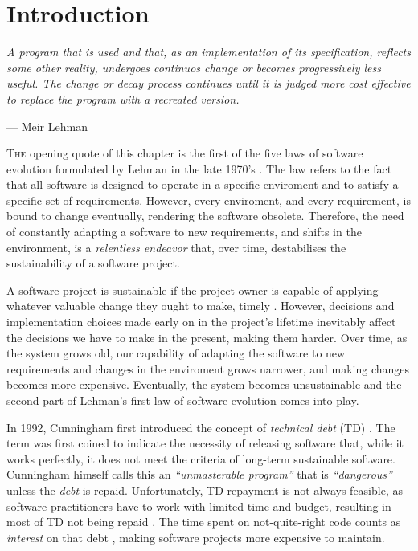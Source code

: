 \chapter{Introduction}\label{chap:introduction}

\epigraph{\emph{A program that is used and that, as an implementation of its specification, reflects some other reality, undergoes continuos change or becomes progressively less useful.
The change or decay process continues until it is judged more cost effective to replace the program with a recreated version.}}{--- Meir Lehman}

\lettrine{T}{he} opening quote of this chapter is the first of the five laws of software evolution formulated by Lehman in the late 1970's \cite{Lehman1979}.
The law refers to the fact that all software is designed to operate in a specific enviroment and to satisfy a specific set of requirements. 
However, every enviroment, and every requirement, is bound to change eventually, rendering the software obsolete. %
Therefore, the need of constantly adapting a software to new requirements, and shifts in the environment, is a \emph{relentless endeavor} that, over time, destabilises the sustainability of a software project.

A software project is sustainable if the project owner is capable of applying whatever valuable change they ought to make, timely \cite{Winters2020}.
However, decisions and implementation choices made early on in the project's lifetime inevitably affect the decisions we have to make in the present, making them harder.
Over time, as the system grows old, our capability of adapting the software to new requirements and changes in the enviroment grows narrower, and making changes becomes more expensive.
Eventually, the system becomes unsustainable and the second part of Lehman's first law of software evolution comes into play.

In 1992, Cunningham first introduced the concept of \emph{technical debt} (TD) \cite{Cunningham1992}. 
The term was first coined to indicate the necessity of releasing software that, while it works perfectly, it does not meet the criteria of long-term sustainable software. 
Cunningham himself calls this an \emph{``unmasterable program''} that is \emph{``dangerous''} unless the \emph{debt} is repaid.
Unfortunately, TD repayment is not always feasible, as software practitioners have to work with limited time and budget, resulting in most of TD not being repaid \cite{Digkas2018}.
The time spent on not-quite-right code counts as \emph{interest} on that debt \cite{Cunningham1992}, making software projects more expensive to maintain.

